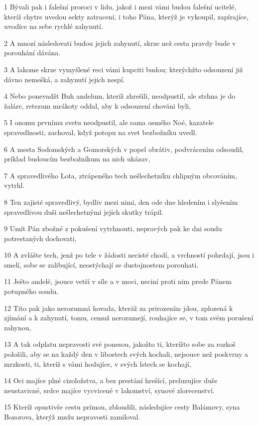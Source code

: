 \par 1 Bývali pak i falešní proroci v lidu, jakož i mezi vámi budou falešní ucitelé, kteríž chytre uvedou sekty zatracení, i toho Pána, kterýž je vykoupil, zapírajíce, uvodíce na sebe rychlé zahynutí.
\par 2 A mnozí následovati budou jejich zahynutí, skrze než cesta pravdy bude v porouhání dávána.
\par 3 A lakome skrze vymyšlené reci vámi kupciti budou; kterýchžto odsouzení již dávno nemešká, a zahynutí jejich nespí.
\par 4 Nebo ponevadžt Buh andelum, kteríž zhrešili, neodpustil, ale strhna je do žaláre, retezum mrákoty oddal, aby k odsouzení chováni byli,
\par 5 I onomu prvnímu svetu neodpustil, ale sama osmého Noé, kazatele spravedlnosti, zachoval, když potopu na svet bezbožníku uvedl.
\par 6 A mesta Sodomských a Gomorských v popel obrátiv, podvrácením odsoudil, príklad budoucím bezbožníkum na nich ukázav,
\par 7 A spravedlivého Lota, ztrápeného tech nešlechetníku chlipným obcováním, vytrhl.
\par 8 Ten zajisté spravedlivý, bydliv mezi nimi, den ode dne hledením i slyšením spravedlivou duši nešlechetnými jejich skutky trápil.
\par 9 Umít Pán zbožné z pokušení vytrhnouti, nepravých pak ke dni soudu potrestaných dochovati,
\par 10 A zvlášte tech, jenž po tele v žádosti necisté chodí, a vrchností pohrdají, jsou i smelí, sobe se zalibující, neostýchají se dustojnostem porouhati.
\par 11 Ješto andelé, jsouce vetší v síle a v moci, neciní proti nim prede Pánem potupného soudu.
\par 12 Tito pak jako nerozumná hovada, kteráž za prirozením jdou, zplozená k zjímání a k zahynutí, tomu, cemuž nerozumejí, rouhajíce se, v tom svém porušení zahynou,
\par 13 A tak odplatu nepravosti své ponesou, jakožto ti, kterížto sobe za rozkoš položili, aby se na každý den v libostech svých kochali, nejsouce než poskvrny a mrzkosti, ti, kteríž s vámi hodujíce, v svých lstech se kochají,
\par 14 Oci majíce plné cizoložstva, a bez prestání hrešící, preluzujíce duše neustavicné, srdce majíce vycvicené v lakomství, synové zlorecenství.
\par 15 Kteríž opustivše cestu prímou, zbloudili, následujíce cesty Balámovy, syna Bozorova, kterýž mzdu nepravosti zamiloval.
